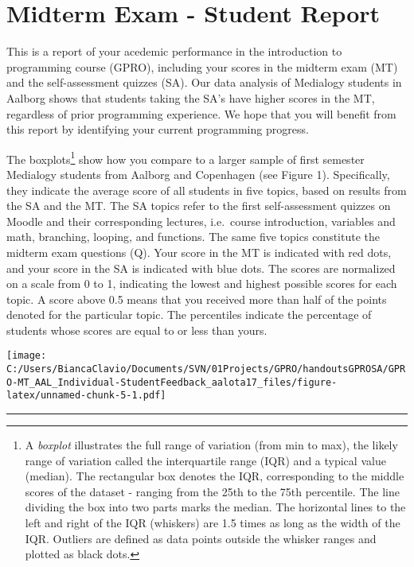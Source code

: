 \documentclass[]{article}
\title{}
\author{}
\date{}
\let\rmarkdownfootnote\footnote%
\def\footnote{\protect\rmarkdownfootnote}
\begin{document}
\section{Midterm Exam - Student
Report}\label{midterm-exam---student-report}

This is a report of your acedemic performance in the introduction to
programming course (GPRO), including your scores in the midterm exam
(MT) and the self-assessment quizzes (SA). Our data analysis of
Medialogy students in Aalborg shows that students taking the SA's have
higher scores in the MT, regardless of prior programming experience. We
hope that you will benefit from this report by identifying your current
programming progress.

The boxplots\footnote{A \emph{boxplot} illustrates the full range of
  variation (from min to max), the likely range of variation called the
  interquartile range (IQR) and a typical value (median). The
  rectangular box denotes the IQR, corresponding to the middle scores of
  the dataset - ranging from the 25th to the 75th percentile. The line
  dividing the box into two parts marks the median. The horizontal lines
  to the left and right of the IQR (whiskers) are 1.5 times as long as
  the width of the IQR. Outliers are defined as data points outside the
  whisker ranges and plotted as black dots.} show how you compare to a
larger sample of first semester Medialogy students from Aalborg and
Copenhagen (see Figure 1). Specifically, they indicate the average score
of all students in five topics, based on results from the SA and the MT.
The SA topics refer to the first self-assessment quizzes on Moodle and
their corresponding lectures, i.e.~course introduction, variables and
math, branching, looping, and functions. The same five topics constitute
the midterm exam questions (Q). Your score in the MT is indicated with
red dots, and your score in the SA is indicated with blue dots. The
scores are normalized on a scale from 0 to 1, indicating the lowest and
highest possible scores for each topic. A score above 0.5 means that you
received more than half of the points denoted for the particular topic.
The percentiles indicate the percentage of students whose scores are
equal to or less than yours.

\texttt{[image: C:/Users/BiancaClavio/Documents/SVN/01Projects/GPRO/handoutsGPROSA/GPRO-MT\_AAL\_Individual-StudentFeedback\_aalota17\_files/figure-latex/unnamed-chunk-5-1.pdf]}

\begin{center}\rule{0.5\linewidth}{\linethickness}\end{center}
\end{document}
